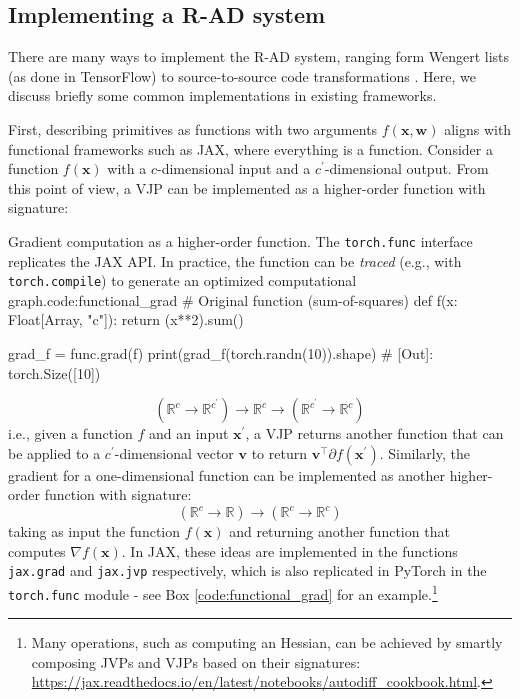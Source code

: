 \subsection{Implementing a R-AD system}
\label{subsec:implementing_rad}
%
There are many ways to implement the R-AD system, ranging form Wengert lists (as done in TensorFlow) to source-to-source code transformations \cite{griewank2008evaluating}. Here, we discuss briefly some common implementations in existing frameworks. 

First, describing primitives as functions with two arguments $f(\mathbf{x}, \mathbf{w})$ aligns with functional frameworks such as JAX, where everything is a function. Consider a function $f(\mathbf{x})$ with a $c$-dimensional input and a $c^\prime$-dimensional output. From this point of view, a VJP can be implemented as a higher-order function with signature:

\begin{mypy}{Gradient computation as a higher-order function. The \texttt{torch.func} interface replicates the JAX API. In practice, the function can be \textit{traced} (e.g., with {\footnotesize\texttt{torch.compile}}) to generate an optimized computational graph.}{code:functional_grad}
# Original function (sum-of-squares)
def f(x: Float[Array, "c"]):
  return (x**2).sum()

grad_f = func.grad(f)
print(grad_f(torch.randn(10)).shape) 
# [Out]: torch.Size([10])
\end{mypy}

\begin{equation}
(\mathbb{R}^c \rightarrow \mathbb{R}^{c^\prime}) \rightarrow \mathbb{R}^c \rightarrow (\mathbb{R}^{c^\prime} \rightarrow \mathbb{R}^c)
\end{equation}
%
i.e., given a function $f$ and an input $\mathbf{x}^\prime$, a VJP returns another function that can be applied to a $c^\prime$-dimensional vector $\mathbf{v}$ to return $\mathbf{v}^\top \partial f(\mathbf{x}^\prime)$. Similarly, the gradient for a one-dimensional function can be implemented as another higher-order function with signature:
%
\begin{equation}
(\mathbb{R}^c \rightarrow \mathbb{R}) \rightarrow (\mathbb{R}^c \rightarrow \mathbb{R}^c)
\end{equation}
%
taking as input the function $f(\mathbf{x})$ and returning another function that computes $\nabla f(\mathbf{x})$. In JAX, these ideas are implemented in the functions {\footnotesize\texttt{jax.grad}} and {\footnotesize\texttt{jax.jvp}} respectively, which is also replicated in PyTorch in the {\footnotesize\texttt{torch.func}} module - see Box \ref{code:functional_grad} for an example.\footnote{Many operations, such as computing an Hessian, can be achieved by smartly composing JVPs and VJPs based on their signatures: \url{https://jax.readthedocs.io/en/latest/notebooks/autodiff_cookbook.html}.}

